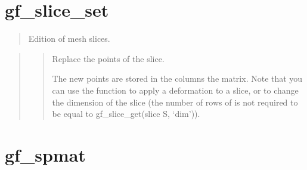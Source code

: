 \documentclass[a4paper,11pt,english]{sphinxmanual}
\begin{document}
\section{gf\_slice\_set}
\label{\detokenize{matlab_octave/cmdref_gf_slice_set:gf-slice-set}}\label{\detokenize{matlab_octave/cmdref_gf_slice_set::doc}}

\begin{sphinxVerbatim}[commandchars=\\\{\}]
    
\end{sphinxVerbatim}

\begin{quote}

Edition of mesh slices.
\end{quote}

\begin{quote}

\begin{quote}

Replace the points of the slice.

The new points  are stored in the columns the matrix. Note that
you can use the function to apply a deformation to a slice, or to
change the dimension of the slice (the number of rows of  is not
required to be equal to gf\_slice\_get(slice S, ‘dim’)).
\end{quote}
\end{quote}


\section{gf\_spmat}
\label{\detokenize{matlab_octave/cmdref_gf_spmat:gf-spmat}}\label{\detokenize{matlab_octave/cmdref_gf_spmat::doc}}
\end{document}
